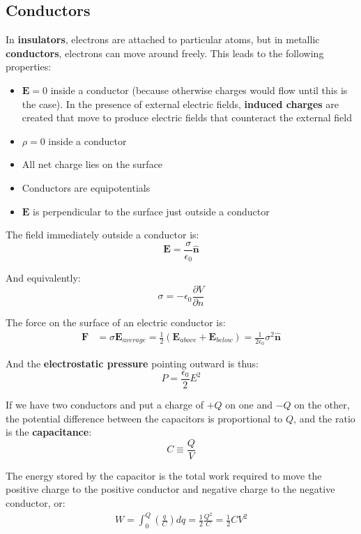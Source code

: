 \documentclass{article}
\begin{document}
\subsection{Conductors}
In \textbf{insulators}, electrons are attached to particular atoms, but in metallic \textbf{conductors}, electrons can move around freely. 
This leads to the following properties:
\begin{itemize}
    \item \(\mathbf{\mathbf{E}} =0\) inside a conductor (because otherwise charges would flow until this is the case). In the presence of external 
    electric fields, \textbf{induced charges} are created that move to produce electric fields that counteract the external field
    \item \(\rho =0\) inside a conductor
    \item All net charge lies on the surface 
    \item Conductors are equipotentials
    \item \(\mathbf{E}\) is perpendicular to the surface just outside a conductor
\end{itemize}

The field immediately outside a conductor is:
\[
    \mathbf{E} =\frac{\sigma }{\epsilon_0} \mathbf{\hat{n}} 
\]

And equivalently:
\[
    \sigma =-\epsilon_0 \frac{\partial V}{\partial n}
\]

The force on the surface of an electric conductor is:
\begin{align*}
    \mathbf{F}&=\sigma \mathbf{E}_{average}=\frac{1}{2}(\mathbf{E}_{above}+\mathbf{E}_{below})=\frac{1}{2 \epsilon_0}\sigma^2 \mathbf{\hat{n}}
\end{align*}

And the \textbf{electrostatic pressure} pointing outward is thus:
\[
    P=\frac{\epsilon_0}{2}E^2
\]

If we have two conductors and put a charge of \(+Q\) on one and \(-Q\) on the other, the potential difference between 
the capacitors is proportional to \(Q\), and the ratio is the \textbf{capacitance}:
\[
    C \equiv \frac{Q}{V}
\]

The energy stored by the capacitor is the total work required to move the positive charge to the positive conductor 
and negative charge to the negative conductor, or:
\begin{align*}
    W=\int_0^Q (\frac{q}{C})dq=\frac{1}{2}\frac{Q^2}{C}=\frac{1}{2}CV^2
\end{align*}
\end{document}
